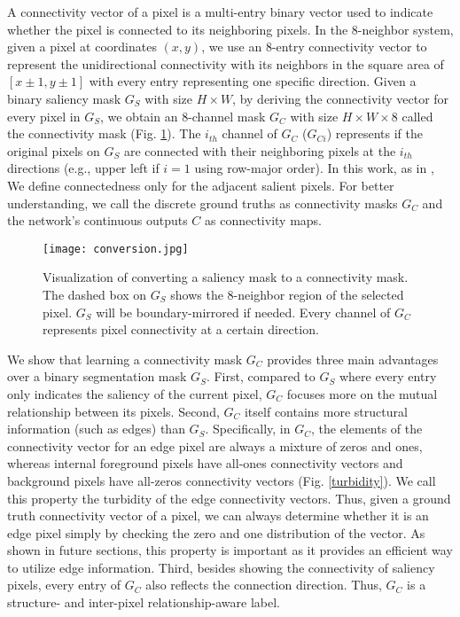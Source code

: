 \documentclass[review]{cvpr}
\begin{document}
A connectivity \cite{connectivity} vector of a pixel is a multi-entry binary vector used to indicate whether the pixel is connected to its neighboring pixels. In the 8-neighbor system, given a pixel at coordinates  $(x,y)$, we use an 8-entry connectivity vector to represent the unidirectional connectivity with its neighbors in the square area of $[x\pm 1,y\pm 1]$ with every entry representing one specific direction. Given a binary saliency mask $G_S$ with size $H\times W$, by deriving the connectivity vector for every pixel in $G_S$, we obtain an 8-channel mask $G_C$ with size $H\times W \times 8$ called the connectivity mask (Fig. \ref{conversion}). The $i_{th}$ channel of $G_{C}$ ($G_{Ci}$) represents if the original pixels on $G_S$ are connected with their neighboring pixels at the $i_{th}$ directions (e.g., upper left if $i=1$ using row-major order). In this work, as in \cite{ConnNet}, We define connectedness only for the adjacent salient pixels. For better understanding, we call the discrete ground truths as connectivity masks $G_C$  and the network’s continuous outputs $C$ as connectivity maps.

\begin{figure}[t]
\begin{center}
   \texttt{[image: conversion.jpg]}
\end{center}
\vspace{-8pt}
   \caption{Visualization of converting a saliency mask to a connectivity mask. The dashed box on $G_S$ shows the 8-neighbor region of the selected pixel. $G_S$ will be boundary-mirrored if needed. Every channel of $G_C$ represents pixel connectivity at a certain direction.}
   \vspace{-10pt}
\label{conversion}
\end{figure}

We show that learning a connectivity mask $G_C$ provides three main advantages over a binary segmentation mask $G_S$. First, compared to $G_S$ where every entry only indicates the saliency of the current pixel, $G_C$ focuses more on the mutual relationship between its pixels. Second, $G_C$ itself contains more structural information (such as edges) than $G_S$. Specifically, in $G_C$, the elements of the connectivity vector for an edge pixel are always a mixture of zeros and ones, whereas internal foreground pixels have all-ones connectivity vectors and background pixels have all-zeros connectivity vectors (Fig. \ref{turbidity}). We call this property the turbidity of the edge connectivity vectors. Thus, given a ground truth connectivity vector of a pixel, we can always determine whether it is an edge pixel %
simply by checking the zero and one distribution of the vector. As shown in future sections, this property is important as it provides an efficient way to utilize edge information. %
Third, besides showing the connectivity of saliency pixels, every entry of $G_C$ also reflects the connection direction. Thus, $G_C$ is a structure- and inter-pixel relationship-aware label.
\end{document}
